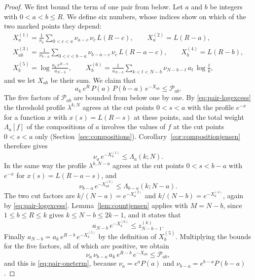 \documentclass{amsart}
\theoremstyle{definition}
\theoremstyle{remark}
\numberwithin{equation}{section}
\begin{document}
\begin{proof}
We first bound the term of one pair from below. Let $a$ and $b$ be integers
with $0<a<b\le R$. We define six numbers, whose indices show on which of the
two marked points they depend:
\begin{gather*}
X^{(1)}_{a}=\frac{1}{\nu_a}\sum_{0<c<a}\nu_{a-c}\,\nu_c\,L(R-c),\qquad
X^{(2)}_{a}=L(R-a),\\
X^{(3)}_{ab}=\frac{1}{\nu_{b-a}}\sum_{0<c<b-a}\nu_{b-a-c}\,\nu_c\,L(R-a-c),
\qquad X^{(4)}_{b}=L(R-b),\\
X^{(5)}_{b}=\log\frac{a_k\,e^{R-b}}{a_{N-b}},\qquad
X^{(6)}_{b}=\frac{1}{a_{N-b}}\sum_{k<t<N-b}\nu_{N-b-t}\,a_t\,\log\frac tk,
\end{gather*}
and we let $X_{ab}$ be their sum. We claim that
\begin{equation}\label{eq:pair-oneterm}
a_k\,e^{R}\,P(a)\,P(b-a)\,e^{-X_{ab}}\le\mathcal P_{ab}.
\end{equation}
The five factors of $\mathcal P_{ab}$ are bounded from below one by one. By
\eqref{eq:pair-logexcess} the threshold profile $\lambda^{k,N}$ agrees at
the cut points $0<s<a$ with the profile $e^{-x}$ for a function $x$ with
$x(s)=L(R-s)$ at these points, and the total weight $\Lambda_a[f]$ of the
compositions of $a$ involves the values of $f$ at the cut points $0<s<a$
only (Section~\ref{sec:compositions}). Corollary~\ref{cor:compositionjensen}
therefore gives
\[
\nu_a\,e^{-X^{(1)}_{a}}\le\Lambda_a(k;N).
\]
In the same way the profile $\lambda^{k,N-a}$ agrees at the cut points
$0<s<b-a$ with $e^{-x}$ for $x(s)=L(R-a-s)$, and
\[
\nu_{b-a}\,e^{-X^{(3)}_{ab}}\le\Lambda_{b-a}(k;N-a).
\]
The two cut factors are $k/(N-a)=e^{-X^{(2)}_{a}}$ and
$k/(N-b)=e^{-X^{(4)}_{b}}$, again by \eqref{eq:pair-logexcess}.
Lemma~\ref{lem:countjensen} applies with $M=N-b$, since $1\le b\le R\le k$
gives $k\le N-b\le2k-1$, and it states that
\[
a_{N-b}\,e^{-X^{(6)}_{b}}\le z^{(k)}_{N-b-1}.
\]
Finally
$a_{N-b}=a_k\,e^{R-b}\,e^{-X^{(5)}_{b}}$ by the definition of $X^{(5)}_{b}$.
Multiplying the bounds for the five factors, all of which are positive, we
obtain
\[
\nu_a\,\nu_{b-a}\,a_k\,e^{R-b}\,e^{-X_{ab}}\le\mathcal P_{ab},
\]
and this is \eqref{eq:pair-oneterm}, because $\nu_a=e^{a}P(a)$ and
$\nu_{b-a}=e^{b-a}P(b-a)$.


\end{proof}
\end{document}
